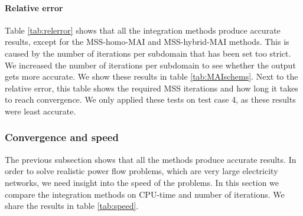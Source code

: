 \documentclass[10pt,journal]{article}
\begin{document}

\paragraph{Relative error}
Table \ref{tab:relerror} shows that all the integration methods produce accurate results, except for the MSS-homo-MAI and MSS-hybrid-MAI methods. This is caused by the number of iterations per subdomain that has been set too strict. We increased the number of iterations per subdomain to see whether the output gets more accurate. We show these results in table \ref{tab:MAIschems}. Next to the relative error, this table shows the required MSS iterations and how long it takes to reach convergence. We only applied these tests on test case 4, as these results were least accurate. 



%

\subsubsection{Convergence and speed} 
The previous subsection shows that all the methods produce accurate results. In order to solve realistic power flow problems, which are very large electricity networks, we need insight into the speed of the problems. In this section we compare the integration methods on CPU-time and number of iterations. We share the results in table \ref{tab:speed}. 


\end{document}
